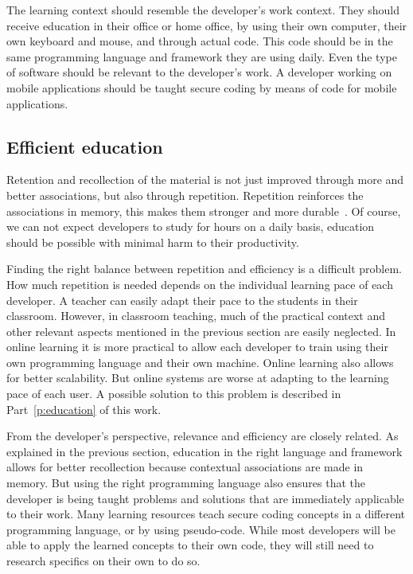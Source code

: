The learning context should resemble the developer's work context. They should receive education in their office or home office, by using their own computer, their own keyboard and mouse, and through actual code. This code should be in the same programming language and framework they are using daily. Even the type of software should be relevant to the developer's work. A developer working on mobile applications should be taught secure coding by means of code for mobile applications.

\subsection{Efficient education}
Retention and recollection of the material is not just improved through more and better associations, but also through repetition. Repetition reinforces the associations in memory, this makes them stronger and more durable~\citep{dirksen2015design}.
Of course, we can not expect developers to study for hours on a daily basis, education should be possible with minimal harm to their productivity.

Finding the right balance between repetition and efficiency is a difficult problem. How much repetition is needed depends on the individual learning pace of each developer. A teacher can easily adapt their pace to the students in their classroom.
However, in classroom teaching, much of the practical context and other relevant aspects mentioned in the previous section are easily neglected. In online learning it is more practical to allow each developer to train using their own programming language and their own machine. Online learning also allows for better scalability. But online systems are worse at adapting to the learning pace of each user. A possible solution to this problem is described in Part~\ref{p:education} of this work.

From the developer's perspective, relevance and efficiency are closely related.
As explained in the previous section, education in the right language and framework allows for better recollection because contextual associations are made in memory. But using the right programming language also ensures that the developer is being taught problems and solutions that are immediately applicable to their work.
Many learning resources teach secure coding concepts in a different programming language, or by using pseudo-code. While most developers will be able to apply the learned concepts to their own code, they will still need to research specifics on their own to do so.

